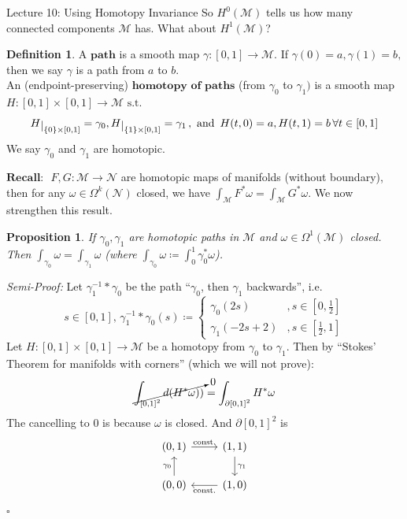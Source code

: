 \documentclass[10pt]{article}
\theoremstyle{plain}
\newtheorem{prop}[thm]{Proposition}
\theoremstyle{definition}
\newtheorem{defn}[thm]{Definition} %
\newenvironment{semiproof}{\textit{Semi-Proof:}}{\hfill$\square$}
\newcommand{\myand}{\text{ and }}
\newcommand{\st}{\text{ s.t. }}
\newcommand{\Recall}{\textbf{Recall: }}
\newcommand{\man}{\mathcal{M}}
\newcommand{\nan}{\mathcal{N}}
\newcommand{\pformman}[1]{\Omega^{#1}(\man)}
\newcommand{\pformnan}[1]{\Omega^{#1}(\nan)}
\newcommand{\deriv}{d}
\def\restrict#1{\raise-.5ex\hbox{\ensuremath|}_{#1}}
\newcommand{\cohomman}[1]{H^{#1}(\man)}
\newcommand{\inter}{\left[0,1\right]}
\begin{document}
\begin{section}{Lecture 10: Using Homotopy Invariance}
So $\cohomman{0}$ tells us how many connected components $\man$ has. What about $\cohomman{1}$?
\begin{defn}
A $\textbf{path}$ is a smooth map $\gamma : \inter \to \man.$ If $\gamma(0) = a, \gamma(1) = b,$ then we say $\gamma $ is a path from $a$ to $b$. 
\\An (endpoint-preserving) $\textbf{homotopy of paths}$ (from $\gamma_0$ to $\gamma_1)$ is a smooth map $H:\inter\times\inter \to \man \st$$$
H\restrict{\{0\}\times\inter} = \gamma_0, H\restrict{\{1\}\times\inter} = \gamma_1\,, \myand \,H(t,0) = a, H(t,1) = b \,\forall t \in \inter$$
We say $\gamma_0$ and $\gamma_1$ are homotopic.
\end{defn}
$\Recall$ $F,G:\man \to \nan$ are homotopic maps of manifolds (without boundary), then for any $\omega\in\pformnan{k}$ closed, we have $\int_\man F^*\omega = \int_\man G^*\omega$. We now strengthen this result.
\begin{prop}\label{prop:integralofhomotopicpathsequal}
If $\gamma_0,\gamma_1$ are homotopic paths in $\man $ and $\omega \in\pformman{1}$ closed. Then  $\int_{\gamma_{0}}\omega = \int_{\gamma_1} \omega$ (where $\int_{\gamma_0} \omega \coloneqq \int_0^1 \gamma_0^* \omega$).
\end{prop}\noindent
\begin{semiproof}
Let $\gamma_1^{-1}* \gamma_0$ be the path ``$\gamma_0$, then $\gamma_1$ backwards'', i.e.
$$s\in\inter, \, \gamma_1^{-1}* \gamma_0(s) \coloneqq \begin{cases} \gamma_0(2s) &,s\in\left[0,\frac{1}{2}\right] \\ \gamma_1(-2s+2) &,s\in \left[\frac{1}{2},1\right]\end{cases}$$
Let $H:\inter\times\inter \to \man$ be a homotopy from $\gamma_0$ to $\gamma_1$. Then by ``Stokes' Theorem for manifolds with corners'' (which we will not prove):
$$\cancelto{0}{\int_{\inter^2} \deriv(H^*\omega))} = \int_{\partial \inter^2} H^*\omega$$
The cancelling to 0 is because $\omega$ is closed.
And $\partial \inter^2$ is $$\begin{tikzcd}
{(0,1)} \arrow[r, "\text{const.}"] & {(1,1)} \arrow[d, "\gamma_1"]      \\
{(0,0)} \arrow[u, "\gamma_0"]      & {(1,0)} \arrow[l, "\text{const.}"]

\end{tikzcd}$$
\end{semiproof}
\end{section}
\end{document}
